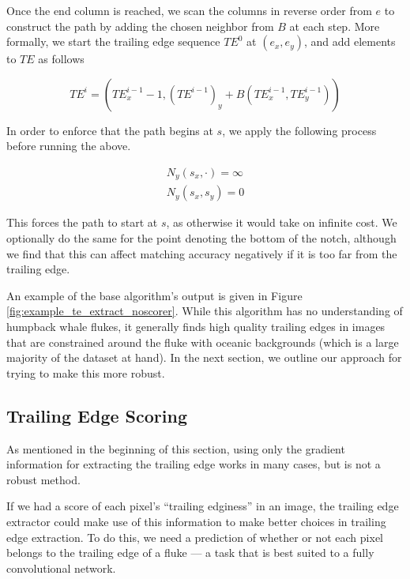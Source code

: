Once the end column is reached, we scan the columns in reverse order from $e$ to construct the path by adding the chosen neighbor from $B$ at each step.
More formally, we start the trailing edge sequence $TE^0$ at $(e_x, e_y)$, and add elements to $TE$ as follows

\begin{equation} \label{eqn:te_build}
	TE^i = (TE^{i-1}_x - 1, (TE^{i-1})_y + B(TE^{i-1}_x,TE^{i-1}_y))
\end{equation}

In order to enforce that the path begins at $s$, we apply the following process before running the above.

\begin{align} \label{eqn:te_setup}
N_y(s_x,\cdot) = \infty \\
N_y(s_x,s_y) = 0
\end{align}

This forces the path to start at $s$, as otherwise it would take on infinite cost.
We optionally do the same for the point denoting the bottom of the notch, although we find that this can affect matching accuracy negatively if it is too far from the trailing edge.

An example of the base algorithm's output is given in Figure \ref{fig:example_te_extract_noscorer}.
While this algorithm has no understanding of humpback whale flukes, it generally finds high quality trailing edges in images that are constrained around the fluke with oceanic backgrounds (which is a large majority of the dataset at hand).
In the next section, we outline our approach for trying to make this more robust.


\subsection{Trailing Edge Scoring}

As mentioned in the beginning of this section, using only the gradient information for extracting the trailing edge works in many cases, but is not a robust method.

If we had a score of each pixel's ``trailing edginess'' in an image, the trailing edge extractor could make use of this information to make better choices in trailing edge extraction.
To do this, we need a prediction of whether or not each pixel belongs to the trailing edge of a fluke --- a task that is best suited to a fully convolutional network.

